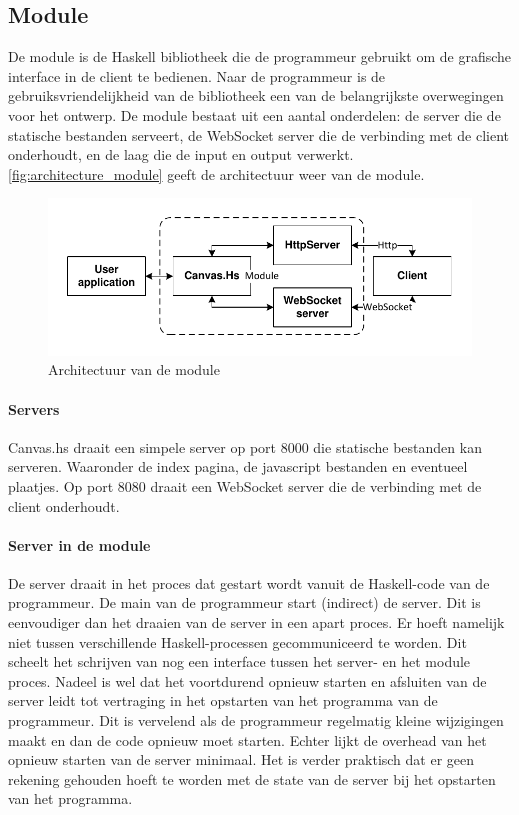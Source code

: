 \subsection{Module} \label{subsec:module}
De module is de Haskell bibliotheek die de programmeur gebruikt om de grafische interface in de client te bedienen. Naar de programmeur is de gebruiksvriendelijkheid van de bibliotheek een van de belangrijkste overwegingen voor het ontwerp. De module bestaat uit een aantal onderdelen: de server die de statische bestanden serveert, de WebSocket server die de verbinding met de client onderhoudt, en de laag die de input en output verwerkt. \autoref{fig:architecture_module} geeft de architectuur weer van de module.

\begin{figure}
\begin{center}
\includegraphics[keepaspectratio,width=\textwidth]{./images/module_architecture.pdf}
\caption{Architectuur van de module}
\label{fig:architecture_module}
\end{center}
\end{figure}

\paragraph{Servers}
Canvas.hs draait een simpele server op port 8000 die statische bestanden kan serveren. Waaronder de index pagina, de javascript bestanden en eventueel plaatjes. Op port 8080 draait een WebSocket server die de verbinding met de client onderhoudt.


\paragraph{Server in de module}
De server draait in het proces dat gestart wordt vanuit de Haskell-code van de programmeur. De main van de programmeur start (indirect) de server. Dit is eenvoudiger dan het draaien van de server in een apart proces. Er hoeft namelijk niet tussen verschillende Haskell-processen gecommuniceerd te worden. Dit scheelt het schrijven van nog een interface tussen het server- en het module proces. Nadeel is wel dat het voortdurend opnieuw starten en afsluiten van de server leidt tot vertraging in het opstarten van het programma van de programmeur. Dit is vervelend als de programmeur regelmatig kleine wijzigingen maakt en dan de code opnieuw moet starten. Echter lijkt de overhead van het opnieuw starten van de server minimaal. Het is verder praktisch dat er geen rekening gehouden hoeft te worden met de state van de server bij het opstarten van het programma.

